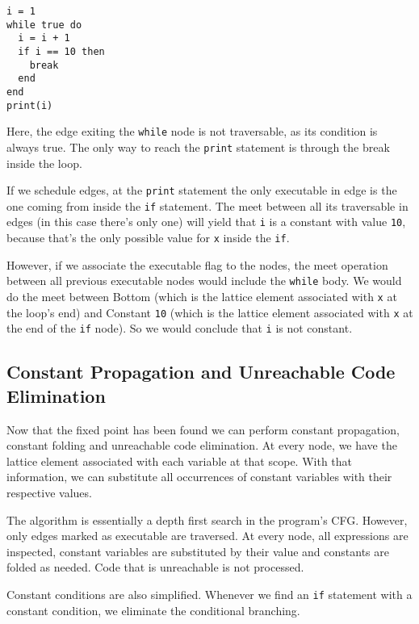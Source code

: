 \documentclass[
]{article}
\begin{document}
\begin{verbatim}
i = 1
while true do
  i = i + 1
  if i == 10 then
    break
  end
end
print(i)
\end{verbatim}

Here, the edge exiting the \texttt{while} node is not traversable, as
its condition is always true. The only way to reach the \texttt{print}
statement is through the break inside the loop.

If we schedule edges, at the \texttt{print} statement the only
executable in edge is the one coming from inside the \texttt{if}
statement. The meet between all its traversable in edges (in this case
there's only one) will yield that \texttt{i} is a constant with value
\texttt{10}, because that's the only possible value for \texttt{x}
inside the \texttt{if}.

However, if we associate the executable flag to the nodes, the meet
operation between all previous executable nodes would include the
\texttt{while} body. We would do the meet between Bottom (which is the
lattice element associated with \texttt{x} at the loop's end) and
Constant \texttt{10} (which is the lattice element associated with
\texttt{x} at the end of the \texttt{if} node). So we would conclude
that \texttt{i} is not constant.

\hypertarget{constant-propagation-and-unreachable-code-elimination}{%
\subsection{Constant Propagation and Unreachable Code
Elimination}\label{constant-propagation-and-unreachable-code-elimination}}

Now that the fixed point has been found we can perform constant
propagation, constant folding and unreachable code elimination. At every
node, we have the lattice element associated with each variable at that
scope. With that information, we can substitute all occurrences of
constant variables with their respective values.

The algorithm is essentially a depth first search in the program's CFG.
However, only edges marked as executable are traversed. At every node,
all expressions are inspected, constant variables are substituted by
their value and constants are folded as needed. Code that is unreachable
is not processed.

Constant conditions are also simplified. Whenever we find an \texttt{if}
statement with a constant condition, we eliminate the conditional
branching.
\end{document}
